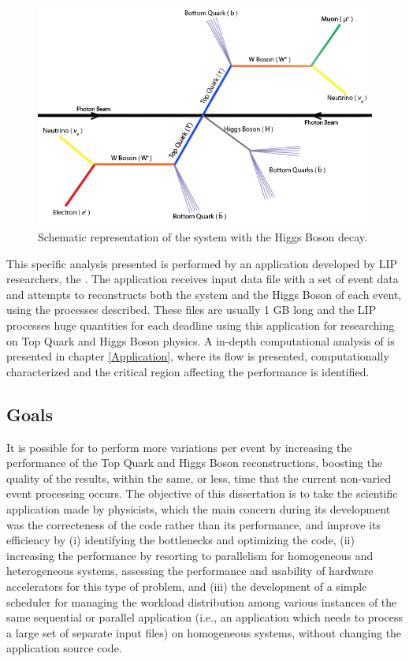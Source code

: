 \begin{figure}[!htp]
	\begin{center}
		\includegraphics[scale=0.5]{../../common/img/ttbar_higgs.png}
		\caption{Schematic representation of the \ttbar system with the Higgs Boson decay.}
		\label{fig:HiggsBosonDecay}
	\end{center}
\end{figure}

This specific analysis presented is performed by an application developed by LIP researchers, the \tth. The application receives input data file with a set of event data and attempts to reconstructs both the \ttbar system and the Higgs Boson of each event, using the processes described. These files are usually 1 GB long and the LIP processes huge quantities for each deadline using this application for researching on Top Quark and Higgs Boson physics. A in-depth computational analysis of \tth is presented in chapter \ref{Application}, where its flow is presented, computationally characterized and the critical region affecting the performance is identified.

\subsection{Goals}
\label{Goals}

It is possible for \tth to perform more variations per event by increasing the performance of the Top Quark and Higgs Boson reconstructions, boosting the quality of the results, within the same, or less, time that the current non-varied event processing occurs. The objective of this dissertation is to take the \tth scientific application made by physicists, which the main concern during its development was the correcteness of the code rather than its performance, and improve its efficiency by (i) identifying the bottlenecks and optimizing the code, (ii) increasing the performance by resorting to parallelism for homogeneous and heterogeneous systems, assessing the performance and usability of hardware accelerators for this type of problem, and (iii) the development of a simple scheduler for managing the workload distribution among various instances of the same sequential or parallel application (i.e., an application which needs to process a large set of separate input files) on homogeneous systems, without changing the application source code.

